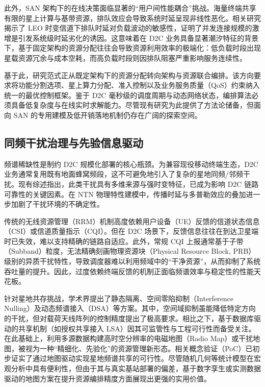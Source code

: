 \documentclass[type=master]{fduthesis}
\begin{document}
此外，SAN 架构下的在线决策面临显著的“用户间性能耦合”挑战。海量终端共享有限的星上计算与基带资源，排队效应会导致系统时延呈现非线性恶化。相关研究揭示了 LEO 时变信道下排队时延对负载波动的敏感性，证明了并发连接规模的激增是引发系统级时延劣化的诱因\cite{9454162}。这意味着在 D2C 业务具备显著潮汐特征的背景下，基于固定架构的资源分配往往会导致资源利用效率的极端化：低负载时段出现星载资源冗余与成本空耗，而高负载时段则因排队阻塞严重影响服务连续性\cite{9970355,9454162}。

基于此，研究范式正从既定架构下的资源分配转向架构与资源联合编排。该方向要求将功能分割选项、星上算力分配、准入控制以及业务服务质量（QoS）约束纳入统一的最优控制框架。鉴于 D2C 毫秒级的调度周期与动态网络状态，编排算法必须具备低复杂度与在线实时求解能力\cite{9781611,9107209}。尽管现有研究为此提供了方法论储备，但面向 SAN 的专用建模及低开销落地机制仍存在广阔的探索空间\cite{campana2023ran,10572042}。

\subsection{同频干扰治理与先验信息驱动}
频谱稀缺性是制约 D2C 规模化部署的核心瓶颈。为兼容现役移动终端生态，D2C 业务通常复用既有地面蜂窝频段，这不可避免地引入了复杂的星地同频/邻频干扰\cite{heydarishahreza2024_spectrumsharing}。现有综述指出，此类干扰具有多维来源与强时变特征，已成为影响 D2C 链路可靠性的关键因素\cite{heydarishahreza2024_spectrumsharing}。在 NTN 物理特性建模中，传播时延与多普勒效应的叠加进一步加剧了干扰环境的不确定性\cite{3gpp.38.811,3gpp.38.821}。

传统的无线资源管理（RRM）机制高度依赖用户设备（UE）反馈的信道状态信息（CSI）或信道质量指示（CQI）。但在 D2C 场景下，反馈信息往往在到达卫星端时已失效，难以支持精确的链路自适应\cite{3gpp.38.821}。此外，常规 CQI 上报通常基于子带（Subband）粒度，无法精确刻画物理资源块（Physical Resource Block, PRB）级别的异质干扰特性，导致调度器难以利用频域中的“干净资源”，从而抑制了系统吞吐量的提升\cite{3gpp.38.214,3gpp.36.213}。因此，过度依赖终端反馈的机制正面临频谱效率与稳定性的性能天花板\cite{heydarishahreza2024_spectrumsharing,3gpp.38.821}。

针对星地共存挑战，学术界提出了静态隔离、空间零陷抑制（Interference Nulling）及动态频谱接入（DSA）等方案。其中，空间域抑制虽能降低特定方向的干扰，但对载荷天线阵列的控制精度提出了极高要求\cite{kang2024_interference_nulling}。相比之下，基于数据库驱动的共享机制（如授权共享接入 LSA）因其可监管性与工程可行性而备受关注\cite{hoyhtya2017_database,milheiro2020_lsa_detector}。在此基础上，利用多源数据构建高时空分辨率的电磁地图（Radio Map）或干扰地图，被视为一种“精细化、先验化”的资源管理新形态。相关概念验证（PoC）已初步证实了通过地图驱动实现星地频谱共享的可行性\cite{kokkinen2023_poc}。尽管随机几何等统计模型在宏观分析中具有便利性，但由于其与真实基站部署的偏差，基于数字孪生或实测数据驱动的地图方案在提升资源编排精度方面展现出更强的实用价值\cite{wang2022_sg_accuracy}。
\end{document}
